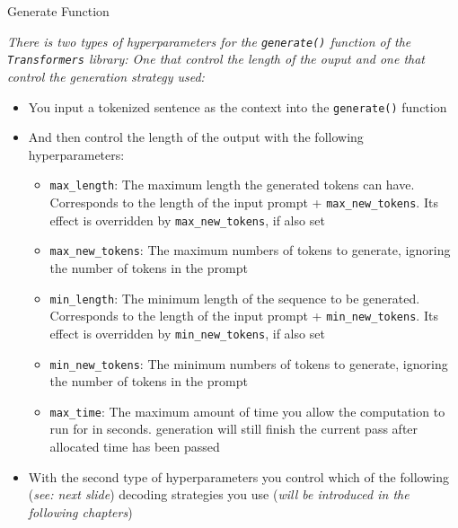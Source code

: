 
\begin{vbframe}{Generate Function}

\textit{There is two types of hyperparameters for the \texttt{generate()} function of the \texttt{Transformers} library: One that control the length of the ouput and one that control the generation strategy used:} 

\hspace{}

\begin{itemize}
    \item You input a tokenized sentence as the context into the \texttt{generate()} function
    \item And then control the length of the output with the following hyperparameters:
    \begin{itemize}
        \item \texttt{max\_length}: The maximum length the generated tokens can have. Corresponds to the length of the input prompt + \texttt{max\_new\_tokens}. Its effect is overridden by \texttt{max\_new\_tokens}, if also set
        \item \texttt{max\_new\_tokens}: The maximum numbers of tokens to generate, ignoring the number of tokens in the prompt
        \item \texttt{min\_length}: The minimum length of the sequence to be generated. Corresponds to the length of the input prompt + \texttt{min\_new\_tokens}. Its effect is overridden by \texttt{min\_new\_tokens}, if also set
        \item \texttt{min\_new\_tokens}: The minimum numbers of tokens to generate, ignoring the number of tokens in the prompt
        \item \texttt{max\_time}: The maximum amount of time you allow the computation to run for in seconds. generation will still finish the current pass after allocated time has been passed
    \end{itemize}
    \item With the second type of hyperparameters you control which of the following (\textit{see: next slide}) decoding strategies you use (\textit{will be introduced in the following chapters})
\end{itemize}


\vfill
    
\end{vbframe}

